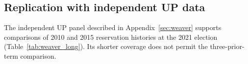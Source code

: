 \subsection{Replication with independent UP data}

The independent UP panel described in Appendix~\ref{sec:weaver} supports comparisons of 2010 and 2015 reservation histories at the 2021 election (Table~\ref{tab:weaver_long}). Its shorter coverage does not permit the three-prior-term comparison.


\FloatBarrier
